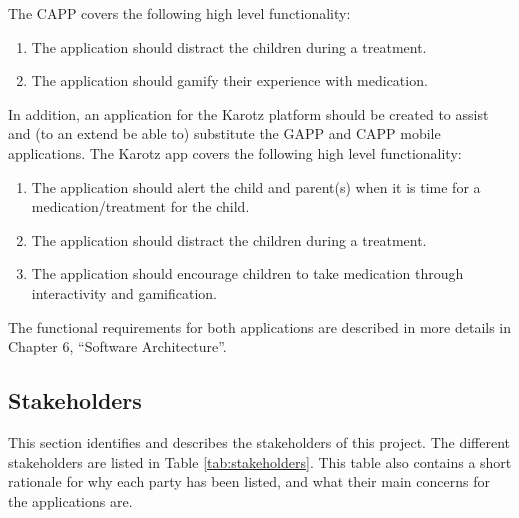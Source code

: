 The CAPP covers the following high level functionality:
\begin{enumerate}
  \item The application should distract the children during a treatment.
  \item The application should gamify their experience with medication. 
\end{enumerate}

In addition, an application for the Karotz platform should be created to assist and (to an extend be able to) substitute 
the GAPP and CAPP mobile applications. The Karotz app covers the following high level functionality:
\begin{enumerate}
  \item The application should alert the child and parent(s) when it is time for a medication/treatment for the child.
  \item The application should distract the children during a treatment.
  \item The application should encourage children to take medication through interactivity and gamification. 
\end{enumerate}

The functional requirements for both applications are described in more details in Chapter 6, ``Software Architecture''.


\subsection{Stakeholders}
This section identifies and describes the stakeholders of this project. The
different stakeholders are listed in Table \ref{tab:stakeholders}. This table also contains
a short rationale for why each party has been listed, and what their main
concerns for the applications are.


